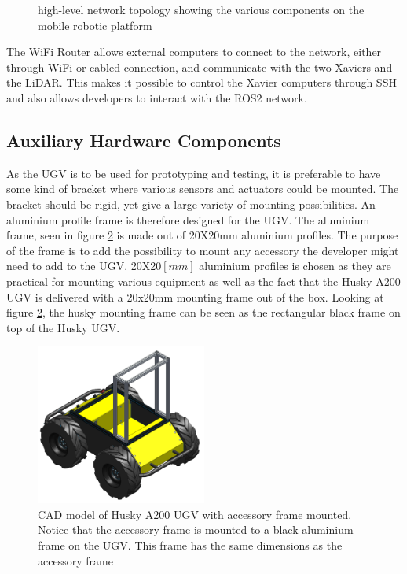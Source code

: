 \begin{figure}[htp!]
    \fontsize{8.5}{14}\selectfont
    \centering
    
    \caption{high-level network topology showing the various components on the mobile robotic platform}
    \label{fig:M:HA:NetworkTopology}
\end{figure}

The WiFi Router allows external computers to connect to the network, either through WiFi or cabled connection, and communicate with the two Xaviers and the LiDAR. This makes it possible to control the Xavier computers through SSH and also allows developers to interact with the ROS2 network.


\subsection{Auxiliary Hardware Components} \label{sec:M:HA:AuxiliaryHardware}
As the UGV is to be used for prototyping and testing, it is preferable to have some kind of bracket where various sensors and actuators could be mounted. The bracket should be rigid, yet give a large variety of mounting possibilities. An aluminium profile frame is therefore designed for the UGV. The aluminium frame, seen in figure \ref{fig:M:H:AMF:userFrame} is made out of 20X20mm aluminium profiles. The purpose of the frame is to add the possibility to mount any accessory the developer might need to add to the UGV. 20X20$[mm]$ aluminium profiles is chosen as they are practical for mounting various equipment as well as the fact that the Husky A200 UGV is delivered with a 20x20mm mounting frame out of the box. Looking at figure \ref{fig:M:H:AMF:userFrame}, the husky mounting frame can be seen as the rectangular black frame on top of the Husky UGV.

\begin{figure}[htp!]
  \centering
  \includegraphics[width = 0.5\textwidth]{Figures/husky_with_frame.png}
  \caption{CAD model of Husky A200 UGV with accessory frame mounted. Notice that the accessory frame is mounted to a black aluminium frame on the UGV. This frame has the same dimensions as the accessory frame}
  \label{fig:M:H:AMF:userFrame}
\end{figure}

